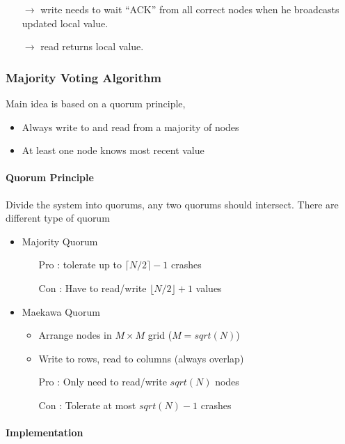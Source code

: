\begin{itemize}
    \item[$\to$] write needs to wait \enquote{ACK} from all correct nodes when he
    broadcasts updated local value.
    \item[$\to$] read returns local value.
\end{itemize}

\subsubsection{Majority Voting Algorithm}
Main idea is based on a quorum principle,
\begin{itemize}
	\item Always write to and read from a majority of nodes
	\item At least one node knows most recent value
\end{itemize}

\paragraph{Quorum Principle}
Divide the system into quorums, any two quorums should intersect.
There are different type of quorum
\begin{itemize}
	\item Majority Quorum
		\begin{itemize}
            \item[Pro]: tolerate up to $\lceil N/2 \rceil -1$ crashes
            \item[Con]: Have to read/write $\lfloor N/2 \rfloor + 1$ values
		\end{itemize}
	\item Maekawa Quorum
		\begin{itemize}
			\item Arrange nodes in $M \times M$ grid ($M=sqrt(N)$)
			\item Write to rows, read to columns (always overlap)
            \item[Pro]: Only need to read/write $sqrt(N)$ nodes
            \item[Con]: Tolerate at most $sqrt(N)-1$ crashes
		\end{itemize}
\end{itemize}

\paragraph{Implementation}

